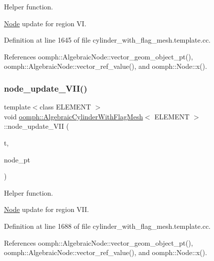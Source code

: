 Helper function. 

\hyperlink{classoomph_1_1Node}{Node} update for region VI. 

Definition at line 1645 of file cylinder\+\_\+with\+\_\+flag\+\_\+mesh.\+template.\+cc.



References oomph\+::\+Algebraic\+Node\+::vector\+\_\+geom\+\_\+object\+\_\+pt(), oomph\+::\+Algebraic\+Node\+::vector\+\_\+ref\+\_\+value(), and oomph\+::\+Node\+::x().

\mbox{\label{classoomph_1_1AlgebraicCylinderWithFlagMesh_abb0565f0624583d2549f38602fd11e48}} 
\subsubsection{\texorpdfstring{node\+\_\+update\+\_\+\+V\+I\+I()}{node\_update\_VII()}}
{\footnotesize\ttfamily template$<$class E\+L\+E\+M\+E\+NT $>$ \\
void \hyperlink{classoomph_1_1AlgebraicCylinderWithFlagMesh}{oomph\+::\+Algebraic\+Cylinder\+With\+Flag\+Mesh}$<$ E\+L\+E\+M\+E\+NT $>$\+::node\+\_\+update\+\_\+\+V\+II (\begin{DoxyParamCaption}\item[{const unsigned \&}]{t,  }\item[{\hyperlink{classoomph_1_1AlgebraicNode}{Algebraic\+Node} $\ast$\&}]{node\+\_\+pt }\end{DoxyParamCaption})\hspace{0.3cm}{\ttfamily [protected]}}



Helper function. 

\hyperlink{classoomph_1_1Node}{Node} update for region V\+II. 

Definition at line 1688 of file cylinder\+\_\+with\+\_\+flag\+\_\+mesh.\+template.\+cc.



References oomph\+::\+Algebraic\+Node\+::vector\+\_\+geom\+\_\+object\+\_\+pt(), oomph\+::\+Algebraic\+Node\+::vector\+\_\+ref\+\_\+value(), and oomph\+::\+Node\+::x().

